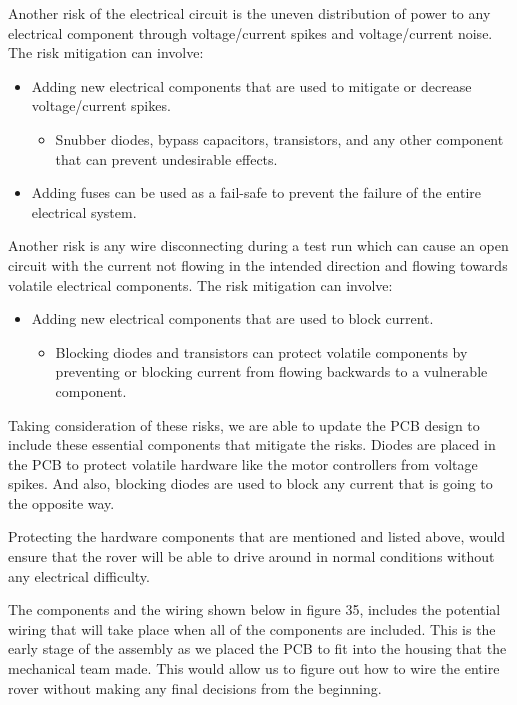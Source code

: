 \documentclass[a4paper, 10pt]{article}
\begin{document}
Another risk of the electrical circuit is the uneven distribution of power to any electrical component through voltage/current spikes and voltage/current noise. The risk mitigation can involve:

\begin{itemize}
\item
Adding new electrical components that are used to mitigate or decrease voltage/current spikes.

	\begin{itemize}
		\item
		Snubber diodes, bypass capacitors, transistors, and any other component that can prevent undesirable effects. 
	\end{itemize}
	
\item
Adding fuses can be used as a fail-safe to prevent the failure of the entire electrical system.
\end{itemize}


Another risk is any wire disconnecting during a test run which can cause an open circuit with the current not flowing in the intended direction and flowing towards volatile electrical components. The risk mitigation can involve:

\begin{itemize}
\item
Adding new electrical components that are used to block current.

	\begin{itemize}
		\item
		Blocking diodes and transistors can protect volatile components by preventing or blocking current from flowing backwards to a vulnerable component. 
	\end{itemize}
\end{itemize}

Taking consideration of these risks, we are able to update the PCB design to include these essential components that mitigate the risks. Diodes are placed in the PCB to protect volatile hardware like the motor controllers from voltage spikes. And also, blocking diodes are used to block any current that is going to the opposite way. 

Protecting the hardware components that are mentioned and listed above, would ensure that the rover will be able to drive around in normal conditions without any electrical difficulty. 

The components and the wiring shown below in figure 35, includes the potential wiring that will take place when all of the components are included. This is the early stage of the assembly as we placed the PCB to fit into the housing that the mechanical team made. This would allow us to figure out how to wire the entire rover without making any final decisions from the beginning.
 
\end{document}
